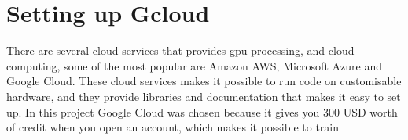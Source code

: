 \chapter{Setting up Gcloud}

There are several cloud services that provides gpu processing, and cloud computing, some of the most popular are Amazon AWS, Microsoft Azure and Google Cloud. These cloud services makes it possible to run code on customisable hardware, and they provide libraries and documentation that makes it easy to set up. In this project Google Cloud was chosen because it gives you 300 USD worth of credit when you open an account, which makes it possible to train 